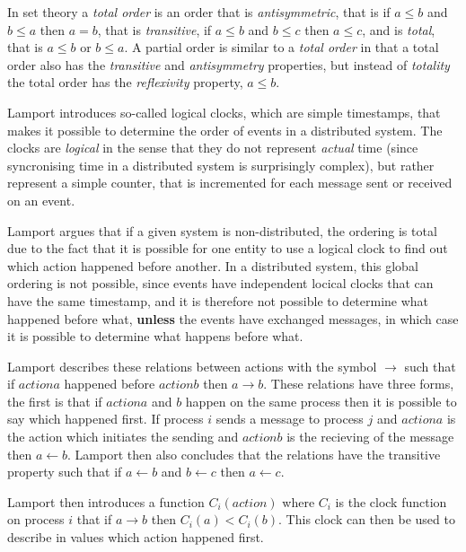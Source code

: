 		\newpar In set theory a \textit{total order} is an order that is \textit{antisymmetric}, that is if $a \leq b$ and $b \leq a$ then $a = b$, that is \textit{transitive}, if $a \leq b$ and $b \leq c$ then $a \leq c$, and is \textit{total}, that is $a \leq b$ or $b \leq a$. A partial order is similar to a \textit{total order} in that a total order also has the \textit{transitive} and \textit{antisymmetry} properties, but instead of \textit{totality} the total order has the \textit{reflexivity} property, $a \leq b$. 
		
		\newpar Lamport introduces so-called logical clocks, which are simple timestamps, that makes it possible to determine the order of events in a distributed system. The clocks are \textit{logical} in the sense that they do not represent \textit{actual} time (since syncronising time in a distributed system is surprisingly complex), but rather represent a simple counter, that is incremented for each message sent or received on an event. 
		
		\newpar Lamport argues that if a given system is non-distributed, the ordering is total due to the fact that it is possible for one entity to use a logical clock to find out which action happened before another. In a distributed system, this global ordering is not possible, since events have independent locical clocks that can have the same timestamp, and it is therefore not possible to determine what happened before what, \textbf{unless} the events have exchanged messages, in which case it is possible to determine what happens before what.
		
		Lamport describes these relations between actions with the symbol $\rightarrow$ such that if $action a$ happened before $action b$ then $a \rightarrow b$. These relations have three forms, the first is that if $action a$ and $b$ happen on the same process then it is possible to say which happened first. If process $i$ sends a message to process $j$ and $action a$ is the action which initiates the sending and $action b$ is the recieving of the message then $a \leftarrow b$. Lamport then also concludes that the relations have the transitive property such that if $a \leftarrow b$ and $b \leftarrow c$ then $a \leftarrow c$. 
		
		\newpar Lamport then introduces a function $C_i(action)$ where $C_i$ is the clock function on process $i$ that if $a \rightarrow b$ then $C_i(a) < C_i(b)$. This clock can then be used to describe in values which action happened first.
		